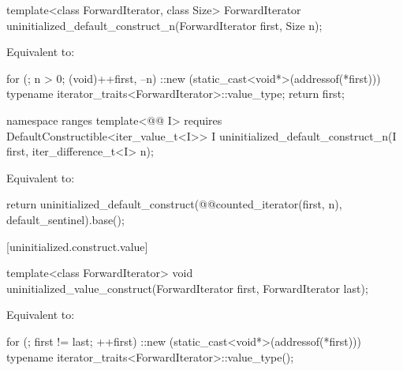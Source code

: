 %
\begin{itemdecl}
template<class ForwardIterator, class Size>
  ForwardIterator uninitialized_default_construct_n(ForwardIterator first, Size n);
\end{itemdecl}

\begin{itemdescr}
\pnum
\effects
Equivalent to:
\begin{codeblock}
for (; n > 0; (void)++first, --n)
  ::new (static_cast<void*>(addressof(*first)))
    typename iterator_traits<ForwardIterator>::value_type;
return first;
\end{codeblock}
\end{itemdescr}

\begin{addedblock}
%
\begin{itemdecl}
namespace ranges {
  template<@@ I>
      requires DefaultConstructible<iter_value_t<I>>
    I uninitialized_default_construct_n(I first, iter_difference_t<I> n);
}
\end{itemdecl}

\begin{itemdescr}
\pnum
\effects Equivalent to:
\begin{codeblock}
return uninitialized_default_construct(@@counted_iterator(first, n),
                                       default_sentinel{}).base();
\end{codeblock}
\end{itemdescr}
\end{addedblock}

[uninitialized.construct.value]{}

%
\begin{itemdecl}
template<class ForwardIterator>
  void uninitialized_value_construct(ForwardIterator first, ForwardIterator last);
\end{itemdecl}

\begin{itemdescr}
\pnum
\effects
Equivalent to:
\begin{codeblock}
for (; first != last; ++first)
  ::new (static_cast<void*>(addressof(*first)))
    typename iterator_traits<ForwardIterator>::value_type();
\end{codeblock}
\end{itemdescr}

